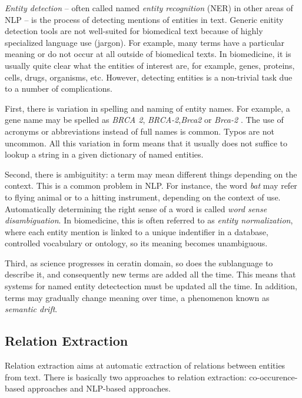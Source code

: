 \emph{Entity detection} -- often called named \emph{entity recognition} (NER) in other areas of NLP -- is the process of detecting mentions of entities in text.
Generic enitity detection tools are not well-suited for biomedical text because of highly specialized language use (jargon). 
For example, many terms have a particular meaning or do not occur at all outside of biomedical texts.
In biomedicine, it is usually quite clear what the entities of interest are, for example, genes, proteins, cells, drugs, organisms, etc.
However, detecting entities is a non-trivial task due to a number of complications.

First, there is variation in spelling and naming of entity names.
For example, a gene name may be spelled as \emph{BRCA 2},\emph{ BRCA-2},\emph{Brca2} or \emph{Brca-2} \citep{Krallinger2010Analysis}.
The use of acronyms or abbreviations instead of full names is common. 
Typos are not uncommon.
All this variation in form means that it usually does not suffice to lookup a string in a given dictionary of named entities.

Second, there is ambiguitity: a term may mean different things depending on the context.
This is a common problem in NLP.
For instance, the word \emph{bat} may refer to flying animal or to a hitting instrument, depending on the context of use.
Automatically determining the right sense of a word is called \emph{word sense disambiguation}.
In biomedicine, this is often referred to as \emph{entity normalization}, where each entity mention is linked to a unique indentifier in a database, controlled vocabulary or ontology, so its meaning becomes unambiguous. 
 
Third, as science progresses in ceratin domain, so does the sublanguage to describe it, and consequently new terms are added all the time.
This means that systems for named entity detectection must be updated all the time. 
In addition, terms may gradually change meaning over time, a phenomenon known as \emph{semantic drift}.

\subsection{Relation Extraction}   

Relation extraction aims at automatic extraction of relations between entities from text.
There is basically two approaches to relation extraction: co-occurence-based approaches and NLP-based approaches.

